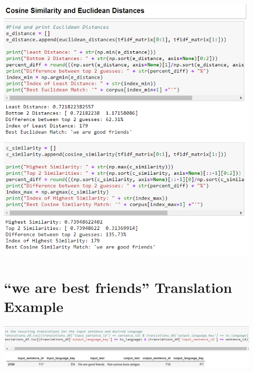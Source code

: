 \documentclass[runningheads]{llncs}
\begin{document}
	\begin{minipage}{\linewidth}
		\begin{center}
			\includegraphics[width=\linewidth]{Friends_Comparison.png}
			\label{fig:Sentence Comparison 1}
			\vspace*{1cm}
		\end{center}
	\end{minipage}
	\afterpage{\clearpage}


\section{``we are best friends'' Translation Example}
\hypertarget{Appendix D}{}


	\begin{minipage}{\linewidth}
		\begin{center}
			\includegraphics[width=\linewidth]{Language_Match.png}
			\label{fig:Translating Matched Sentence  to Portuguese}
			\vspace*{1cm}
		\end{center}
	\end{minipage}
	\afterpage{\clearpage}
\end{document}

